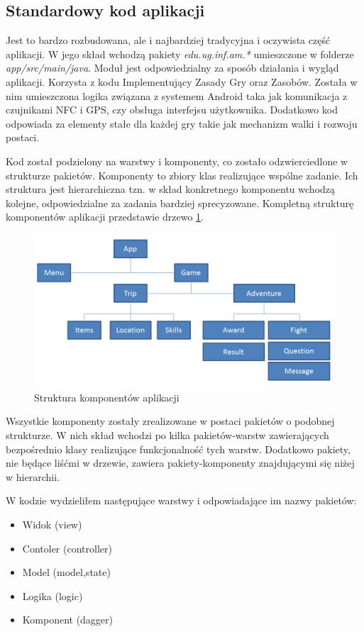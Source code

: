 \documentclass[openright]{xmgr}
\begin{document}
\subsection*{Standardowy kod aplikacji} 

Jest to bardzo rozbudowana, ale i najbardziej tradycyjna i oczywista część aplikacji. W jego skład wchodzą pakiety \textit{edu.ug.inf.am.*} umieszczone w folderze \textit{app/src/main/java}. Moduł jest odpowiedzialny za sposób działania i wygląd aplikacji. Korzysta z kodu Implementujący Zasady Gry oraz Zasobów. Została w nim umieszczona logika związana z systemem Android taka jak komunikacja z czujnikami NFC i GPS, czy obsługa interfejsu użytkownika. Dodatkowo kod odpowiada za elementy stałe dla każdej gry takie jak mechanizm walki i rozwoju postaci.

Kod został podzielony na warstwy i komponenty, co zostało odzwierciedlone w strukturze pakietów. 
Komponenty to zbiory klas realizujące wspólne zadanie. Ich struktura jest hierarchiczna tzn. w skład konkretnego komponentu wchodzą kolejne, odpowiedzialne za zadania bardziej sprecyzowane. Kompletną strukturę komponentów aplikacji przedstawie drzewo \ref{modules:tree}.

\begin{figure}[!tbh]
	\centering
	\includegraphics[width=1.0\hsize]{fig/modules_tree}
	\caption{Struktura komponentów aplikacji}
	\label{modules:tree}
\end{figure}

Wszystkie komponenty zostały zrealizowane w postaci pakietów o podobnej strukturze. W nich skład wchodzi po kilka pakietów-warstw zawierających bezpośrednio klasy realizujące funkcjonalność tych warstw. Dodatkowo pakiety, nie będące liśćmi w drzewie, zawiera pakiety-komponenty znajdującymi się niżej w hierarchii.

W kodzie wydzieliłem następujące warstwy i odpowiadające im nazwy pakietów:
\begin{itemize}
	\item Widok (view)
	\item Contoler (controller)
	\item Model (model,state)
	\item Logika (logic)
	\item Komponent (dagger)
\end{itemize}
\end{document}

